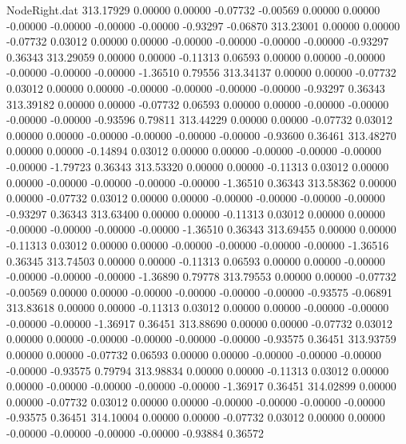 \begin{filecontents}{NodeRight.dat}
 313.17929    0.00000    0.00000    -0.07732   -0.00569    0.00000    0.00000   -0.00000   -0.00000   -0.00000   -0.00000   -0.93297   -0.06870
 313.23001    0.00000    0.00000    -0.07732    0.03012    0.00000    0.00000   -0.00000   -0.00000   -0.00000   -0.00000   -0.93297    0.36343
 313.29059    0.00000    0.00000    -0.11313    0.06593    0.00000    0.00000   -0.00000   -0.00000   -0.00000   -0.00000   -1.36510    0.79556
 313.34137    0.00000    0.00000    -0.07732    0.03012    0.00000    0.00000   -0.00000   -0.00000   -0.00000   -0.00000   -0.93297    0.36343
 313.39182    0.00000    0.00000    -0.07732    0.06593    0.00000    0.00000   -0.00000   -0.00000   -0.00000   -0.00000   -0.93596    0.79811
 313.44229    0.00000    0.00000    -0.07732    0.03012    0.00000    0.00000   -0.00000   -0.00000   -0.00000   -0.00000   -0.93600    0.36461
 313.48270    0.00000    0.00000    -0.14894    0.03012    0.00000    0.00000   -0.00000   -0.00000   -0.00000   -0.00000   -1.79723    0.36343
 313.53320    0.00000    0.00000    -0.11313    0.03012    0.00000    0.00000   -0.00000   -0.00000   -0.00000   -0.00000   -1.36510    0.36343
 313.58362    0.00000    0.00000    -0.07732    0.03012    0.00000    0.00000   -0.00000   -0.00000   -0.00000   -0.00000   -0.93297    0.36343
 313.63400    0.00000    0.00000    -0.11313    0.03012    0.00000    0.00000   -0.00000   -0.00000   -0.00000   -0.00000   -1.36510    0.36343
 313.69455    0.00000    0.00000    -0.11313    0.03012    0.00000    0.00000   -0.00000   -0.00000   -0.00000   -0.00000   -1.36516    0.36345
 313.74503    0.00000    0.00000    -0.11313    0.06593    0.00000    0.00000   -0.00000   -0.00000   -0.00000   -0.00000   -1.36890    0.79778
 313.79553    0.00000    0.00000    -0.07732   -0.00569    0.00000    0.00000   -0.00000   -0.00000   -0.00000   -0.00000   -0.93575   -0.06891
 313.83618    0.00000    0.00000    -0.11313    0.03012    0.00000    0.00000   -0.00000   -0.00000   -0.00000   -0.00000   -1.36917    0.36451
 313.88690    0.00000    0.00000    -0.07732    0.03012    0.00000    0.00000   -0.00000   -0.00000   -0.00000   -0.00000   -0.93575    0.36451
 313.93759    0.00000    0.00000    -0.07732    0.06593    0.00000    0.00000   -0.00000   -0.00000   -0.00000   -0.00000   -0.93575    0.79794
 313.98834    0.00000    0.00000    -0.11313    0.03012    0.00000    0.00000   -0.00000   -0.00000   -0.00000   -0.00000   -1.36917    0.36451
 314.02899    0.00000    0.00000    -0.07732    0.03012    0.00000    0.00000   -0.00000   -0.00000   -0.00000   -0.00000   -0.93575    0.36451
 314.10004    0.00000    0.00000    -0.07732    0.03012    0.00000    0.00000   -0.00000   -0.00000   -0.00000   -0.00000   -0.93884    0.36572

\end{filecontents}

